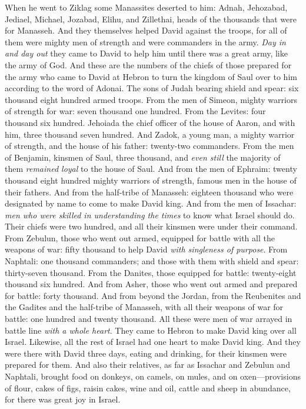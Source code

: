 \begin{biblechapter}
\verse When he went to Ziklag some Manassites deserted to him: Adnah, Jehozabad, Jediael, Michael, Jozabad, Elihu, and Zillethai, heads of the thousands that were for Manasseh.
\verse And they themselves helped David against the troops, for all of them were mighty men of strength and were commanders in the army.
\verse \textit{Day in and day out} they came to David to help him until there was a great army, like the army of God.
\verse And these are the numbers of the chiefs of those prepared for the army who came to David at Hebron to turn the kingdom of Saul over to him according to the word of Adonai.
\verse The sons of Judah bearing shield and spear: six thousand eight hundred armed troops.
\verse From the men of Simeon, mighty warriors of strength for war: seven thousand one hundred.
\verse From the Levites: four thousand six hundred.
\verse Jehoiada the chief officer of the house of Aaron, and with him, three thousand seven hundred.
\verse And Zadok, a young man, a mighty warrior of strength, and the house of his father: twenty-two commanders.
\verse From the men of Benjamin, kinsmen of Saul, three thousand, and \textit{even still} the majority of them \textit{remained loyal} to the house of Saul.
\verse And from the men of Ephraim: twenty thousand eight hundred mighty warriors of strength, famous men in the house of their fathers.
\verse And from the half-tribe of Manasseh: eighteen thousand who were designated by name to come to make David king.
\verse And from the men of Issachar: \textit{men who were skilled in understanding the times} to know what Israel should do. Their chiefs were two hundred, and all their kinsmen were under their command.
\verse From Zebulun, those who went out armed, equipped for battle with all the weapons of war: fifty thousand to help David \textit{with singleness of purpose}.
\verse From Naphtali: one thousand commanders; and those with them with shield and spear: thirty-seven thousand.
\verse From the Danites, those equipped for battle: twenty-eight thousand six hundred.
\verse And from Asher, those who went out armed and prepared for battle: forty thousand.
\verse And from beyond the Jordan, from the Reubenites and the Gadites and the half-tribe of Manasseh, with all their weapons of war for battle: one hundred and twenty thousand.
\verse All these were men of war arrayed in battle line \textit{with a whole heart}. They came to Hebron to make David king over all Israel. Likewise, all the rest of Israel had one heart to make David king.
\verse And they were there with David three days, eating and drinking, for their kinsmen were prepared for them.
\verse And also their relatives, as far as Issachar and Zebulun and Naphtali, brought food on donkeys, on camels, on mules, and on oxen—provisions of flour, cakes of figs, raisin cakes, wine and oil, cattle and sheep in abundance, for there was great joy in Israel.
\end{biblechapter}

